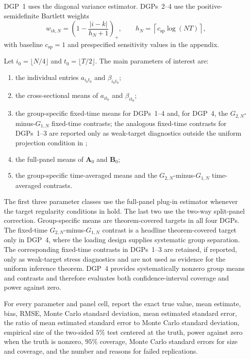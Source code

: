 \documentclass[11pt]{article}
\numberwithin{equation}{section}
\theoremstyle{remark}
\newcommand{\bA}{\bm A}
\newcommand{\bB}{\bm B}
\begin{document}
DGP~1 uses the diagonal variance estimator. DGPs~2--4 use the positive-semidefinite Bartlett weights
$$
w_{ik,N}
=
\left(1-\frac{|i-k|}{h_N+1}\right)_+,
\qquad
h_N=\left\lceil c_{\mathrm{sp}}\log(NT)\right\rceil,
$$
with baseline $c_{\mathrm{sp}}=1$ and prespecified sensitivity values in the appendix.

Let $i_0=\lfloor N/4\rfloor$ and $t_0=\lfloor T/2\rfloor$. The main parameters of interest are:
\begin{enumerate}[label=(\roman*),leftmargin=2em]
\item the individual entries $a_{i_0t_0}$ and $\beta_{i_0t_0}$;
\item the cross-sectional means of $a_{it_0}$ and $\beta_{it_0}$;
\item the group-specific fixed-time means for DGPs~1--4 and, for DGP~4, the $G_{2,N}$-minus-$G_{1,N}$ fixed-time contrasts; the analogous fixed-time contrasts for DGPs~1--3 are reported only as weak-target diagnostics outside the uniform projection condition in ;
\item the full-panel means of $\bA_0$ and $\bB_0$;
\item the group-specific time-averaged means and the $G_{2,N}$-minus-$G_{1,N}$ time-averaged contrasts.
\end{enumerate}
The first three parameter classes use the full-panel plug-in estimator whenever the target regularity conditions in  hold. The last two use the two-way split-panel correction. Group-specific means are theorem-covered targets in all four DGPs. The fixed-time $G_{2,N}$-minus-$G_{1,N}$ contrast is a headline theorem-covered target only in DGP~4, where the loading design supplies systematic group separation. The corresponding fixed-time contrasts in DGPs~1--3 are retained, if reported, only as weak-target stress diagnostics and are not used as evidence for the uniform inference theorem. DGP~4 provides systematically nonzero group means and contrasts and therefore evaluates both confidence-interval coverage and power against zero.

For every parameter and panel cell, report the exact true value, mean estimate, bias, RMSE, Monte Carlo standard deviation, mean estimated standard error, the ratio of mean estimated standard error to Monte Carlo standard deviation, empirical size of the two-sided $5\%$ test centered at the truth, power against zero when the truth is nonzero, $95\%$ coverage, Monte Carlo standard errors for size and coverage, and the number and reasons for failed replications.
\end{document}
